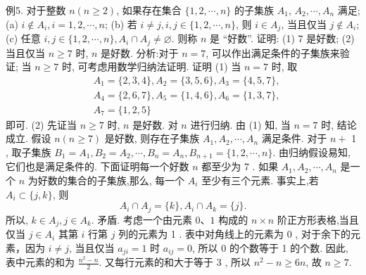 例5. 对于整数 $n(n \geqslant 2)$, 如果存在集合 $\{1,2, \cdots, n\}$ 的子集族 $A_1$, $A_2, \cdots, A_n$ 满足;
(a) $i \notin A_i, i=1,2, \cdots, n$;
(b) 若 $i \neq j, i, j \in\{1,2, \cdots, n\}$, 则 $i \in A_j$, 当且仅当 $j \notin A_i$;
(c) 任意 $i, j \in\{1,2, \cdots, n\}, A_i \cap A_j \neq \varnothing$.
则称 $n$ 是 “好数”.
证明: (1) 7 是好数;
(2)当且仅当 $n \geqslant 7$ 时, $n$ 是好数.
分析:对于 $n=7$, 可以作出满足条件的子集族来验证; 当 $n \geqslant 7$ 时, 可考虑用数学归纳法证明.
证明 (1) 当 $n=7$ 时, 取
$$
\begin{aligned}
& A_1=\{2,3,4\}, A_2=\{3,5,6\}, A_3=\{4,5,7\}, \\
& A_4=\{2,6,7\}, A_5=\{1,4,6\}, A_6=\{1,3,7\}, \\
& A_7=\{1,2,5\}
\end{aligned}
$$
即可.
(2) 先证当 $n \geqslant 7$ 时, $n$ 是好数.
对 $n$ 进行归纳.
由 (1) 知, 当 $n=7$ 时, 结论成立.
假设 $n(n \geqslant 7)$ 是好数, 则存在子集族 $A_1, A_2, \cdots, A_n$ 满足条件.
对于 $n+$ 1 , 取子集族 $B_1=A_1, B_2=A_2, \cdots, B_n=A_n, B_{n+1}=\{1,2, \cdots, n\}$. 由归纳假设易知, 它们也是满足条件的.
下面证明每一个好数 $n$ 都至少为 7 .
如果 $A_1, A_2, \cdots, A_n$ 是一个 $n$ 为好数的集合的子集族,那么, 每一个 $A_i$ 至少有三个元素.
事实上,若 $A_i \subset\{j, k\}$, 则
$$
A_i \cap A_j=\{k\}, A_i \cap A_k=\{j\} .
$$
所以, $k \in A_j, j \in A_k$. 矛盾.
考虑一个由元素 $0 、 1$ 构成的 $n \times n$ 阶正方形表格,当且仅当 $j \in A_i$ 其第 $i$ 行第 $j$ 列的元素为 1 . 表中对角线上的元素为 0 , 对于余下的元素，因为 $i \neq j$, 当且仅当 $a_{j i}=1$ 时 $a_{i j}=0$, 所以 0 的个数等于 1 的个数.
因此, 表中元素的和为 $\frac{n^2-n}{2}$. 又每行元素的和大于等于 3 , 所以 $n^2-n \geqslant 6 n$, 故 $n \geqslant 7$.



